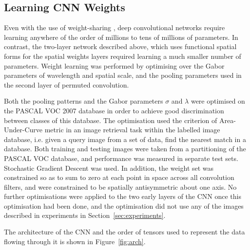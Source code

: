 \subsection{Learning CNN Weights}

Even with the use of weight-sharing \cite{lecun1995convolutional}, deep convolutional networks require learning anywhere of the order of millions to tens of millions of parameters. In contrast, the two-layer network described above, which uses functional spatial forms for the spatial weights layers required learning a much smaller number of parameters.  Weight learning was performed by optimising over the Gabor parameters of wavelength and spatial scale, and the pooling parameters used in the second layer of permuted convolution.

Both the pooling patterns and the Gabor parameters $\sigma$ and $\lambda$ were optimised on the PASCAL VOC 2007 database \cite{everingham2010pascal} in order to achieve good discrimination between classes of this database. The optimisation used the criterion of Area-Under-Curve metric in an image retrieval task within the labelled image database, i.e. given a query image from a set of data, find the nearest match in a database.  Both training and testing images were taken from a partitioning of the PASCAL VOC database, and performance was measured in separate test sets.  Stochastic Gradient Descent was used. In addition, the weight set was constrained so as to sum to zero at each point in space across all convolution filters, and were constrained to be spatially antisymmetric about one axis.  No further optimisations were applied to the two early layers of the CNN once this optimisation had been done, and the optimisation did not use any of the images described in experiments in Section~\ref{sec:experiments}.

The architecture of the CNN and the order of tensors used to represent the data flowing through it is shown in Figure~\ref{fig:arch}.

